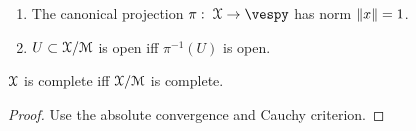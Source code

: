 \begin{corol}
\begin{enumerate}
\item The canonical projection $\pi\from \vesp \to \vespy$ has norm $\Vert x\Vert =1$.\item $U\subset \EuScript{X}/\EuScript{M}$ is open iff $\pi^{-1}(U)$ is open.
\end{enumerate}
\end{corol}

\begin{teorema}
$\EuScript{X}$ is complete iff $\EuScript{X}/\EuScript{M}$ is complete.
\begin{proof}
Use the absolute convergence and Cauchy criterion.
\end{proof}
\end{teorema}
